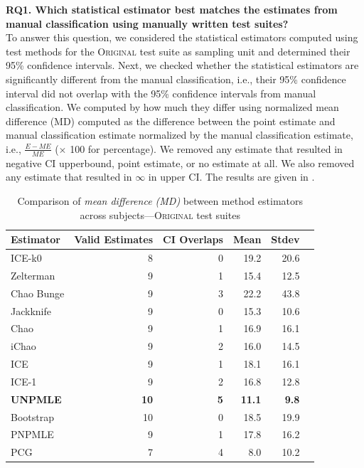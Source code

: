 \documentclass[sigconf,review,anonymous]{acmart}
\newcommand{\ICEallrare}{ICE-k0\xspace}
\newcommand{\Zelterman}{Zelterman\xspace}
\newcommand{\ChaoBunge}{Chao Bunge\xspace}
\newcommand{\Jackknife}{Jackknife\xspace}
\newcommand{\Chao}{Chao\xspace}
\newcommand{\improvedChao}{iChao\xspace}
\newcommand{\ICE}{ICE\xspace}
\newcommand{\improvedICE}{ICE-1\xspace}
\newcommand{\Unpmle}{UNPMLE\xspace}
\newcommand{\Bootstrap}{Bootstrap\xspace}
\newcommand{\Pnpmle}{PNPMLE\xspace}
\newcommand{\PCG}{PCG\xspace}
\newcounter{todocounter}
\newcommand{\todo}[1]{\marginpar{$|$}\textcolor{red}{\stepcounter{todocounter}\footnote[\thetodocounter]{\textcolor{red}{\textbf{TODO }}\textit{#1}}}}
\newcommand{\original}{\textsc{Original}\xspace}
\newcommand{\B}[1]{\textbf{#1}}
\renewcommand{\todo}[1]{}
\begin{document}
\noindent\textbf{RQ1. Which statistical estimator best matches the
estimates from manual classification %
using manually written test suites?}\\
%
To answer this question, we considered the statistical estimators computed
using test methods for the \original test suite as sampling unit and determined
their 95\% confidence intervals.
%
Next, we checked whether the statistical estimators are significantly different
from the manual classification, i.e.,  their 95\% confidence interval did not overlap
with the 95\% confidence intervals from manual classification. We computed
by how much they differ using normalized mean difference (MD) computed as the
difference between the point estimate and manual classification estimate
normalized by the manual classification estimate, i.e., $\frac{E - ME}{ME}$ ($\times$
100 for percentage). We removed any estimate that resulted in negative
CI upperbound, point estimate, or no estimate at all. We also removed any
estimate that resulted in $\infty$ in upper CI. The results are given in
.\todo{Valid estimates}

\begin{table}
\caption{Comparison of \emph{mean difference (MD)} between method estimators
across subjects---\original test suites}
\begin{tabular}{|l|r|r|r|r|r|}
\hline

Estimator	&Valid Estimates	&CI Overlaps	&Mean	&Stdev	\\
\hline
\ICEallrare		&	8	&	0	&19.2	&	20.6\\
\Zelterman		&	9	&	1	&15.4	&	12.5\\
\ChaoBunge		&	9	&	3	&22.2	&	43.8\\
\Jackknife		&	9	&	0	&15.3	&	10.6\\
\Chao	        	&	9	&	1	&16.9	&	16.1\\
\improvedChao		&	9	&	2	&16.0	&	14.5\\
\ICE			&	9	&	1	&18.1	&	16.1\\
\improvedICE		&	9	&	2	&16.8	&	12.8\\
\B{\Unpmle}			&	\B{10}	&	\B{5}	& \B{11.1}	&	\B{9.8}\\
\Bootstrap		&	10	&	0	&18.5	&	19.9\\
\Pnpmle			&	9	&	1	&17.8	&	16.2\\
\PCG			&	7	&	4	&8.0	&	10.2\\
\hline
\end{tabular}
\label{tbl:estoriginal}
\end{table}
\end{document}
